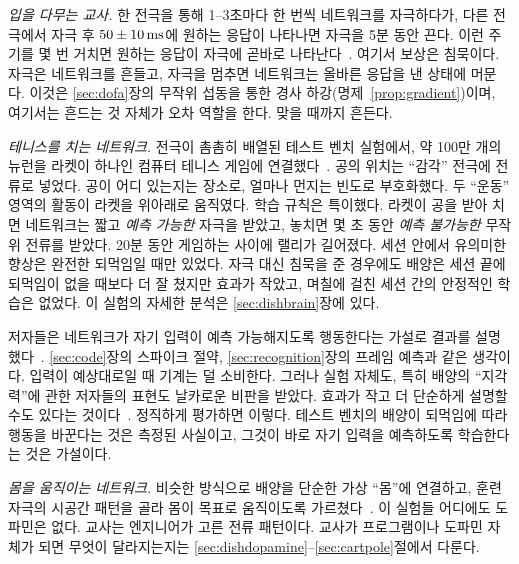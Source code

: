 \emph{입을 다무는 교사.} 한 전극을 통해 1--3초마다 한 번씩 네트워크를 자극하다가, 다른 전극에서 자극 후 $50\pm10\,\text{ms}$에 원하는 응답이 나타나면 자극을 5분 동안 끈다. 이런 주기를 몇 번 거치면 원하는 응답이 자극에 곧바로 나타난다~\cite{Shahaf2001}. 여기서 보상은 침묵이다. 자극은 네트워크를 흔들고, 자극을 멈추면 네트워크는 올바른 응답을 낸 상태에 머문다. 이것은 \ref{sec:dofa}장의 무작위 섭동을 통한 경사 하강(명제~\ref{prop:gradient})이며, 여기서는 흔드는 것 자체가 오차 역할을 한다. 맞을 때까지 흔든다.

\emph{테니스를 치는 네트워크.} 전극이 촘촘히 배열된 테스트 벤치 실험에서, 약 100만 개의 뉴런을 라켓이 하나인 컴퓨터 테니스 게임에 연결했다~\cite{Kagan2022}. 공의 위치는 “감각” 전극에 전류로 넣었다. 공이 어디 있는지는 장소로, 얼마나 먼지는 빈도로 부호화했다. 두 “운동” 영역의 활동이 라켓을 위아래로 움직였다. 학습 규칙은 특이했다. 라켓이 공을 받아 치면 네트워크는 짧고 \emph{예측 가능한} 자극을 받았고, 놓치면 몇 초 동안 \emph{예측 불가능한} 무작위 전류를 받았다. 20분 동안 게임하는 사이에 랠리가 길어졌다. 세션 안에서 유의미한 향상은 완전한 되먹임일 때만 있었다. 자극 대신 침묵을 준 경우에도 배양은 세션 끝에 되먹임이 없을 때보다 더 잘 쳤지만 효과가 작았고, 며칠에 걸친 세션 간의 안정적인 학습은 없었다. 이 실험의 자세한 분석은 \ref{sec:dishbrain}장에 있다.

저자들은 네트워크가 자기 입력이 예측 가능해지도록 행동한다는 가설로 결과를 설명했다~\cite{Friston2010}. \ref{sec:code}장의 스파이크 절약, \ref{sec:recognition}장의 프레임 예측과 같은 생각이다. 입력이 예상대로일 때 기계는 덜 소비한다. 그러나 실험 자체도, 특히 배양의 “지각력”에 관한 저자들의 표현도 날카로운 비판을 받았다. 효과가 작고 더 단순하게 설명할 수도 있다는 것이다~\cite{Balci2023}. 정직하게 평가하면 이렇다. 테스트 벤치의 배양이 되먹임에 따라 행동을 바꾼다는 것은 측정된 사실이고, 그것이 바로 자기 입력을 예측하도록 학습한다는 것은 가설이다.

\emph{몸을 움직이는 네트워크.} 비슷한 방식으로 배양을 단순한 가상 “몸”에 연결하고, 훈련 자극의 시공간 패턴을 골라 몸이 목표로 움직이도록 가르쳤다~\cite{Bakkum2008}. 이 실험들 어디에도 도파민은 없다. 교사는 엔지니어가 고른 전류 패턴이다. 교사가 프로그램이나 도파민 자체가 되면 무엇이 달라지는지는 \ref{sec:dishdopamine}--\ref{sec:cartpole}절에서 다룬다.

